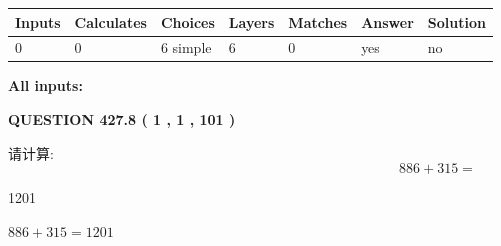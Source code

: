 \documentclass{ctexart}
\begin{document}
 
\noindent{}
 
 
   
   
   
   
\noindent\begin{tabular}{|l|l|l|l|l|l|l|}
 \hline
Inputs & Calculates & Choices & Layers & Matches & Answer & Solution \\ \hline
 0  & 
 0  & 
 6
  simple  
  & 
 6  & 
 0  & 
  yes & 
  no 
  \\ \hline
 \end{tabular}
   
   
   
   
\noindent{}
   
   
   
   
\noindent\vspace{0.1in}\hspace{-0.08in} {\textbf{\Large{All inputs: }}}
   
   
  
\vspace{0.2in}
  
{\textbf{\Large{QUESTION
427.8 
 ( 1 , 1 , 101 )
}}}
  
  
 
请计算:
\begin{equation}
886 +  %
315 = \nonumber
\end{equation}
 
 
 
\noindent{}
 
 

1201
 
 
\noindent{}
 
 

 
 
 
\noindent{}
 
 

$ %
886 +  %
315=   %
1201$
 
 
\noindent{}
 
 

 
   
\end{document}
